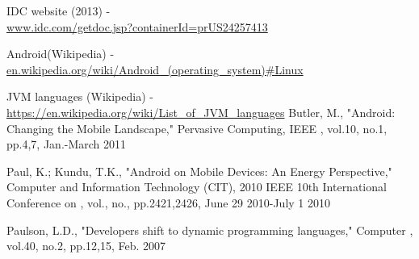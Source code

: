 \documentclass{sigplanconf}
\def \ANDROID{\mbox{Android}\xspace}
\def \JVM{JVM\xspace}
\begin{document}
\begin{thebibliography}{}
  \softraggedright

  IDC website (2013) - \\ \url{www.idc.com/getdoc.jsp?containerId=prUS24257413}

  \ANDROID (Wikipedia) - \\ \url{en.wikipedia.org/wiki/Android\_(operating\_system)#Linux}

  \JVM languages (Wikipedia) - \\ \url{https://en.wikipedia.org/wiki/List\_of\_JVM\_languages}
   Butler, M., "Android: Changing the Mobile Landscape," Pervasive Computing, IEEE , vol.10, no.1, pp.4,7, Jan.-March 2011

  Paul, K.; Kundu, T.K., "Android on Mobile Devices: An Energy Perspective," Computer and Information Technology (CIT), 2010 IEEE 10th International Conference on , vol., no., pp.2421,2426, June 29 2010-July 1 2010

  Paulson, L.D., "Developers shift to dynamic programming languages," Computer , vol.40, no.2, pp.12,15, Feb. 2007


\end{thebibliography}
\end{document}
